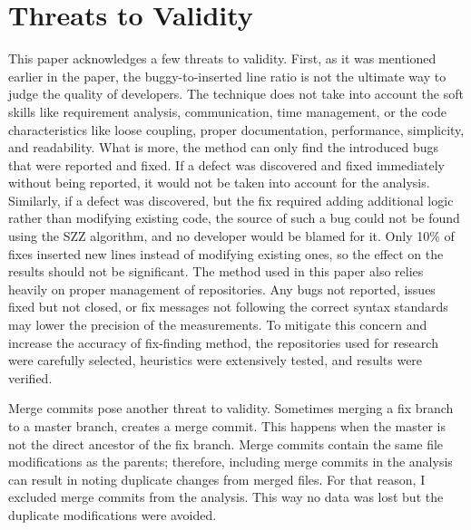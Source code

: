 
\chapter{Threats to Validity}\label{chapter:threats}
This paper acknowledges a few threats to validity. First, as it was mentioned earlier in the paper, the buggy-to-inserted line ratio is not the ultimate way to judge the quality of developers. The technique does not take into account the soft skills like requirement analysis, communication, time management, or the code characteristics like loose coupling, proper documentation, performance, simplicity, and readability. What is more, the method can only find the introduced bugs that were reported and fixed. If a defect was discovered and fixed immediately without being reported, it would not be taken into account for the analysis. Similarly, if a defect was discovered, but the fix required adding additional logic rather than modifying existing code, the source of such a bug could not be found using the SZZ algorithm\parencite{Sliwerski}, and no developer would be blamed for it. Only 10\% of fixes inserted new lines instead of modifying existing ones, so the effect on the results should not be significant. The method used in this paper also relies heavily on proper management of repositories. Any bugs not reported, issues fixed but not closed, or fix messages not following the correct syntax standards may lower the precision of the measurements. To mitigate this concern and increase the accuracy of fix-finding method, the repositories used for research were  carefully selected, heuristics were extensively tested, and results were verified. \par

Merge commits pose another threat to validity. Sometimes merging a fix branch to a master branch, creates a merge commit. This happens when the master is not the direct ancestor of the fix branch. Merge commits contain the same file modifications as the parents; therefore, including merge commits in the analysis can result in noting duplicate changes from merged files. For that reason, I excluded merge commits from the analysis. This way no data was lost but the duplicate modifications were avoided. \par

